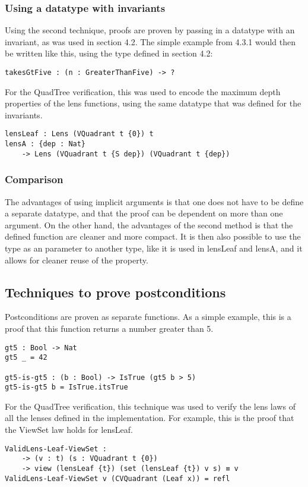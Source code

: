 \subsubsection{Using a datatype with invariants}
Using the second technique, proofs are proven by passing in a datatype with an invariant, as was used in section 4.2. The simple example from 4.3.1 would then be written like this, using the type defined in section 4.2:
\begin{verbatim}
takesGtFive : (n : GreaterThanFive) -> ?
\end{verbatim}

For the QuadTree verification, this was used to encode the maximum depth properties of the lens functions, using the same datatype that was defined for the invariants.
\begin{verbatim}
lensLeaf : Lens (VQuadrant t {0}) t
lensA : {dep : Nat} 
    -> Lens (VQuadrant t {S dep}) (VQuadrant t {dep})
\end{verbatim}

\subsubsection{Comparison}
The advantages of using implicit arguments is that one does not have to be define a separate datatype, and that the proof can be dependent on more than one argument. On the other hand, the advantages of the second method is that the defined function are cleaner and more compact. It is then also possible to use the type as an parameter to another type, like it is used in lensLeaf and lensA, and it allows for cleaner reuse of the property.

\subsection{Techniques to prove postconditions}
Postconditions are proven as separate functions. As a simple example, this is a proof that this function returns a number greater than 5.
\begin{verbatim}
gt5 : Bool -> Nat
gt5 _ = 42

gt5-is-gt5 : (b : Bool) -> IsTrue (gt5 b > 5)
gt5-is-gt5 b = IsTrue.itsTrue
\end{verbatim}

For the QuadTree verification, this technique was used to verify the lens laws of all the lenses defined in the implementation. For example, this is the proof that the ViewSet law holds for lensLeaf.
\begin{verbatim}
ValidLens-Leaf-ViewSet : 
    -> (v : t) (s : VQuadrant t {0}) 
    -> view (lensLeaf {t}) (set (lensLeaf {t}) v s) ≡ v
ValidLens-Leaf-ViewSet v (CVQuadrant (Leaf x)) = refl
\end{verbatim}

